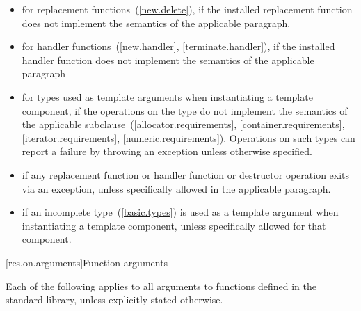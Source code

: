 \begin{itemize}
\item
for replacement functions~(\ref{new.delete}), if the installed replacement function does not
implement the semantics of the applicable
\required
paragraph.
\item
for handler functions~(\ref{new.handler}, \ref{terminate.handler}),
if the installed handler function does not implement the semantics of the applicable
\required
paragraph
\item
for types used as template arguments when instantiating a template component,
if the operations on the type do not implement the semantics of the applicable
subclause~(\ref{allocator.requirements}, \ref{container.requirements}, \ref{iterator.requirements},
\ref{numeric.requirements}).
Operations on such types can report a failure by throwing an exception
unless otherwise specified.
\item
if any replacement function or handler function or destructor operation exits via an exception,
unless specifically allowed
in the applicable
\required
paragraph.
\item
if an incomplete type~(\ref{basic.types}) is used as a template
argument when instantiating a template component, unless specifically
allowed for that component.
\end{itemize}

[res.on.arguments]{Function arguments}

\pnum
{}%
%
Each of the following applies to all arguments
%
to functions defined in the \Cpp standard library,%
unless explicitly stated otherwise.


